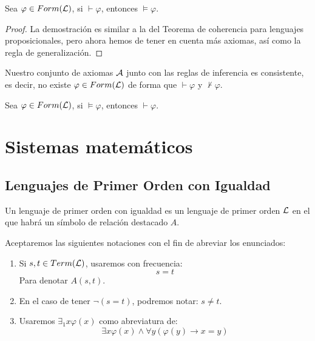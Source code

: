 \begin{teo}[de coherencia]
    Sea $\varphi \in Form(\mathcal{L})$, si $\vdash \varphi$, entonces $\vDash \varphi$.
    \begin{proof}
        La demostración es similar a la del Teorema de coherencia para lenguajes proposicionales, pero ahora hemos de tener en cuenta más axiomas, así como la regla de generalización.
    \end{proof}
\end{teo}

\begin{teo}[de consistencia]
    Nuestro conjunto de axiomas $\mathcal{A}$ junto con las reglas de inferencia es consistente, es decir, no existe $\varphi \in Form(\mathcal{L})$ de forma que $\vdash \varphi$ y $\nvdash\varphi$.
\end{teo}

\begin{teo}[de adecuación]
    Sea $\varphi \in Form(\mathcal{L})$, si $\vDash\varphi$, entonces $\vdash \varphi$.
\end{teo}

\section{Sistemas matemáticos}
\subsection{Lenguajes de Primer Orden con Igualdad}
Un lenguaje de primer orden con igualdad es un lenguaje de primer orden $\mathcal{L}$ en el que habrá un símbolo de relación destacado $A$.

\begin{notacion}
    Aceptaremos las siguientes notaciones con el fin de abreviar los enunciados:
    \begin{enumerate}
        \item Si $s,t\in Term(\mathcal{L})$, usaremos con frecuencia:
            \begin{equation*}
                s = t
            \end{equation*}
            Para denotar $A(s,t)$.
        \item En el caso de tener $\lnot (s = t)$, podremos notar: $s\neq t$.
        \item Usaremos $\exists_1 x\varphi(x)$ como abreviatura de:
            \begin{equation*}
                \exists x\varphi(x) \land \forall y(\varphi(y) \to x=y)
            \end{equation*}
    \end{enumerate}
\end{notacion}

